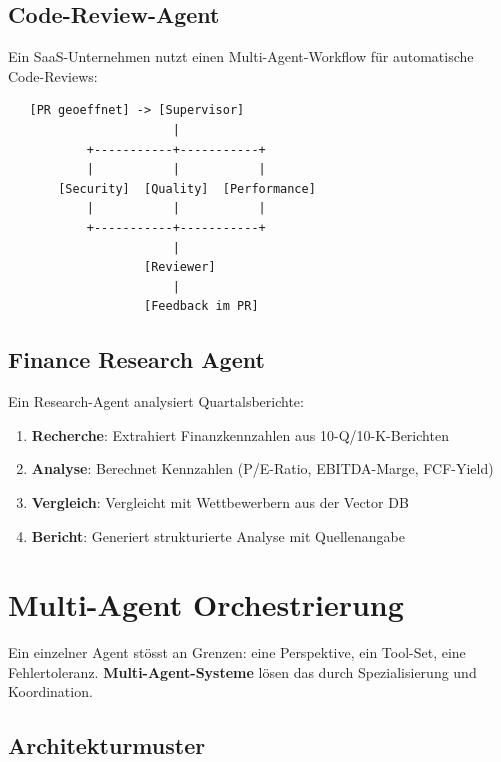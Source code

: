 \subsection{Code-Review-Agent}

Ein SaaS-Unternehmen nutzt einen Multi-Agent-Workflow für automatische Code-Reviews:

\begin{verbatim}
   [PR geoeffnet] -> [Supervisor]
                       |
           +-----------+-----------+
           |           |           |
       [Security]  [Quality]  [Performance]
           |           |           |
           +-----------+-----------+
                       |
                   [Reviewer]
                       |
                   [Feedback im PR]
\end{verbatim}

\subsection{Finance Research Agent}

Ein Research-Agent analysiert Quartalsberichte:

\begin{enumerate}[leftmargin=*]
    \item \textbf{Recherche}: Extrahiert Finanzkennzahlen aus 10-Q/10-K-Berichten
    \item \textbf{Analyse}: Berechnet Kennzahlen (P/E-Ratio, EBITDA-Marge, FCF-Yield)
    \item \textbf{Vergleich}: Vergleicht mit Wettbewerbern aus der Vector DB
    \item \textbf{Bericht}: Generiert strukturierte Analyse mit Quellenangabe
\end{enumerate}

\section{Multi-Agent Orchestrierung}
\label{sec:multi-agent}

Ein einzelner Agent stösst an Grenzen: eine Perspektive, ein Tool-Set, eine Fehlertoleranz. \textbf{Multi-Agent-Systeme} lösen das durch Spezialisierung und Koordination.

\subsection{Architekturmuster}

